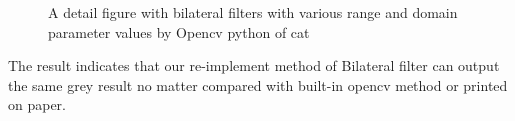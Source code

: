 \documentclass[12pt]{article}
\begin{document}
\begin{figure}[htbp]
  \quad
  \quad
  \quad
  \caption{A detail figure with bilateral filters with various range and domain parameter values by Opencv python of cat}
  \end{figure}


The result indicates that our re-implement method of Bilateral filter can output the same grey result no matter compared with built-in opencv method or printed on paper.
\end{document}
